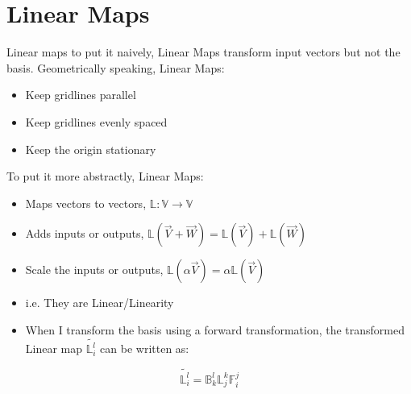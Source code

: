 \section{Linear Maps}
Linear maps to put it naively, Linear Maps transform input vectors but not the basis. Geometrically speaking, Linear Maps:
\begin{itemize}
	\item Keep gridlines parallel
	\item Keep gridlines evenly spaced
	\item Keep the origin stationary
\end{itemize}
To put it more abstractly, Linear Maps:
\begin{itemize}
	\item Maps vectors to vectors, $\mathbb{L}: \mathbb{V} \rightarrow \mathbb{V}$
	\item Adds inputs or outputs, $\mathbb{L}(\vec{V} + \vec{W}) = \mathbb{L}(\vec{V}) + \mathbb{L}(\vec{W})$
	\item Scale the inputs or outputs, $\mathbb{L}(\alpha \vec{V}) = \alpha \mathbb{L}(\vec{V})$
	\item i.e. They are Linear/Linearity
	\item When I transform the basis using a forward transformation, the transformed Linear map $\tilde{\mathbb{L}^{l}_{i}}$ can be written as:
\end{itemize}

\begin{equation}
\tilde{\mathbb{L}^{l}_{i}} = \mathbb{B}^{l}_{k} \mathbb{L}^{k}_{j} \mathbb{F}^{j}_{i}
\end{equation}

